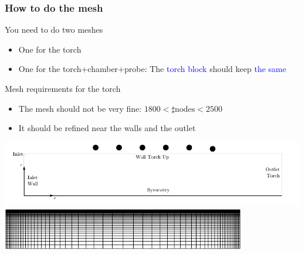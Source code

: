 \documentclass[compress,10pt]{beamer}
\begin{document}
\begin{frame}[fragile]
 \frametitle{How to do the mesh}
\begin{block}{ You need to do two meshes}
\begin{itemize}
\item One for the torch
\item One for the torch+chamber+probe: The \textcolor{blue}{torch block} should keep \textcolor{blue}{the same}
\end{itemize}
\end{block}
\begin{block}{Mesh requirements for the torch}
\begin{itemize}
 \item The mesh should not be very fine: $1800<\sharp \textrm{nodes}<2500$
 \item It should be refined near the walls and the outlet
\end{itemize}
\end{block}
\begin{center}
\vspace*{-0.1cm}
  \includegraphics[width=\textwidth]{geom_torch.pdf}\\
\vspace*{-0.1cm}
  \includegraphics[width=0.8\textwidth]{mesh_torch_3.png}
\end{center}
\end{frame}
 
\end{document}
